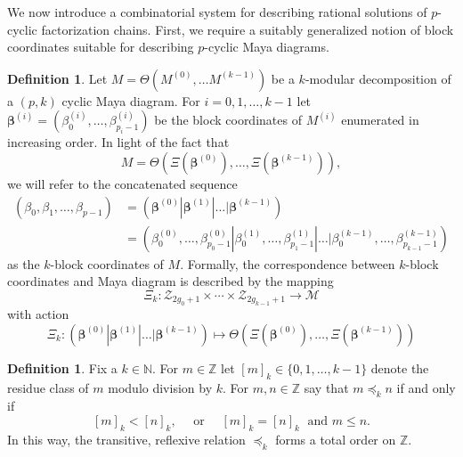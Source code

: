 \documentclass[10pt]{amsart}
\theoremstyle{definition}
\newcommand{\todo}[1]{\vspace{5 mm}\par \noindent
\marginpar{\textsc{ToDo}}
\framebox{\begin{minipage}[c]{\textwidth}
\tt #1 \end{minipage}}\vspace{5 mm}\par}
\newtheorem{definition}[thm]{Definition}
\numberwithin{equation}{section}
\numberwithin{figure}{section}
\newcommand{\N}{\mathbb{N}}
\newcommand{\Z}{\mathbb{Z}}
\newcommand{\bbeta}{{\boldsymbol{\beta}}}
\newcommand{\cM}{\mathcal{M}}
\newcommand{\cZ}{\mathcal{Z}}
\begin{document}



We now introduce a combinatorial system for describing rational
solutions of $p$-cyclic factorization chains.  First, we require a
suitably generalized notion of block coordinates suitable for
describing $p$-cyclic Maya diagrams.
\begin{definition}
  Let $M=\Theta\left(M^{(0)},\ldots M^{(k-1)}\right)$ be a $k$-modular decomposition of a
  $(p,k)$ cyclic Maya diagram.  For $i=0,1,\ldots, k-1$ let
  $\bbeta^{(i)}= \left(\beta^{(i)}_{0}, \ldots,
    \beta^{(i)}_{p_i-1}\right)$
  be the block coordinates of $M^{(i)}$ enumerated in increasing order.
  In light of the fact that
  \[ M = \Theta\left(\Xi(\bbeta^{(0)}), \ldots , \Xi(\bbeta^{(k-1)})\right),\]
  we will refer to the concatenated sequence
  \begin{align*}
    (\beta_0,\beta_1,\ldots, \beta_{p-1}) 
    &= (\bbeta^{(0)} | \bbeta^{(1)} | \ldots |
      \bbeta^{(k-1)}) \\
    &=  \left( \beta^{(0)}_{0}, \ldots, \beta^{(0)}_{p_0-1} |
      \beta^{(1)}_{0}, \ldots, \beta^{(1)}_{p_1-1} 
      | \ldots | \beta^{(k-1)}_{0},\ldots, \beta^{(k-1)}_{p_{k-1}-1}\right) 
  \end{align*}
  as the $k$-block coordinates of $M$.  Formally, the correspondence
  between $k$-block coordinates and Maya diagram is described by the
  mapping
  \[ \Xi_k\colon \cZ_{2g_0+1} \times \cdots \times \cZ_{2g_{k-1}+1} \to \cM \]
  with action
  \[ \Xi_k \colon (\bbeta^{(0)} | \bbeta^{(1)} | \ldots |
      \bbeta^{(k-1)})\mapsto \Theta\left(\Xi(\bbeta^{(0)}), \ldots ,
    \Xi(\bbeta^{(k-1)})\right) \]
\end{definition}


\begin{definition}
  Fix a $k\in \N$. For $m\in \Z$ let $[m]_k\in \{ 0,1,\ldots, k-1 \}$
  denote the residue class of $m$ modulo division by $k$.  For
  $m,n \in \Z$ say that $m \preccurlyeq_k n$ if and only if
  \[ [m]_k < [n]_k,\quad \text{ or } \quad [m]_k = [n]_k\; \text{ and
  } m\leq n.\]
  In this way, the transitive, reflexive relation $\preccurlyeq_k$
  forms a total order on $\Z$.
\end{definition}
\end{document}
